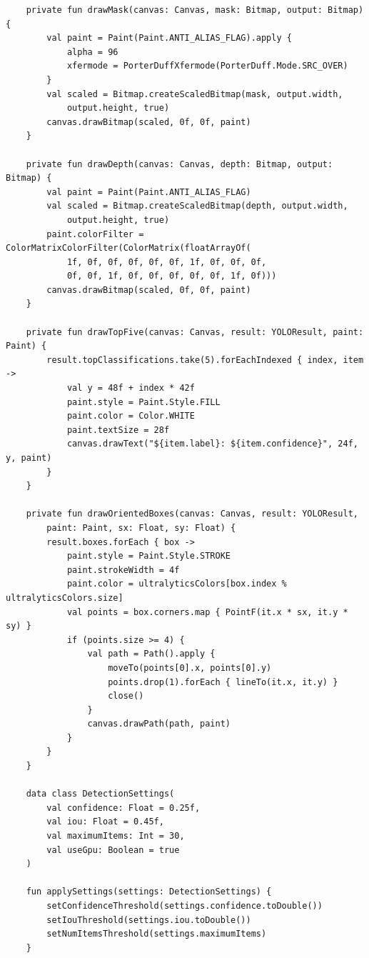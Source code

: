 \clearpage
\begingroup
\fontsize{6.5pt}{6.8pt}\selectfont
\begin{verbatim}
    private fun drawMask(canvas: Canvas, mask: Bitmap, output: Bitmap) {
        val paint = Paint(Paint.ANTI_ALIAS_FLAG).apply {
            alpha = 96
            xfermode = PorterDuffXfermode(PorterDuff.Mode.SRC_OVER)
        }
        val scaled = Bitmap.createScaledBitmap(mask, output.width,
            output.height, true)
        canvas.drawBitmap(scaled, 0f, 0f, paint)
    }

    private fun drawDepth(canvas: Canvas, depth: Bitmap, output: Bitmap) {
        val paint = Paint(Paint.ANTI_ALIAS_FLAG)
        val scaled = Bitmap.createScaledBitmap(depth, output.width,
            output.height, true)
        paint.colorFilter = ColorMatrixColorFilter(ColorMatrix(floatArrayOf(
            1f, 0f, 0f, 0f, 0f, 0f, 1f, 0f, 0f, 0f,
            0f, 0f, 1f, 0f, 0f, 0f, 0f, 0f, 1f, 0f)))
        canvas.drawBitmap(scaled, 0f, 0f, paint)
    }

    private fun drawTopFive(canvas: Canvas, result: YOLOResult, paint: Paint) {
        result.topClassifications.take(5).forEachIndexed { index, item ->
            val y = 48f + index * 42f
            paint.style = Paint.Style.FILL
            paint.color = Color.WHITE
            paint.textSize = 28f
            canvas.drawText("${item.label}: ${item.confidence}", 24f, y, paint)
        }
    }

    private fun drawOrientedBoxes(canvas: Canvas, result: YOLOResult,
        paint: Paint, sx: Float, sy: Float) {
        result.boxes.forEach { box ->
            paint.style = Paint.Style.STROKE
            paint.strokeWidth = 4f
            paint.color = ultralyticsColors[box.index % ultralyticsColors.size]
            val points = box.corners.map { PointF(it.x * sx, it.y * sy) }
            if (points.size >= 4) {
                val path = Path().apply {
                    moveTo(points[0].x, points[0].y)
                    points.drop(1).forEach { lineTo(it.x, it.y) }
                    close()
                }
                canvas.drawPath(path, paint)
            }
        }
    }

    data class DetectionSettings(
        val confidence: Float = 0.25f,
        val iou: Float = 0.45f,
        val maximumItems: Int = 30,
        val useGpu: Boolean = true
    )

    fun applySettings(settings: DetectionSettings) {
        setConfidenceThreshold(settings.confidence.toDouble())
        setIouThreshold(settings.iou.toDouble())
        setNumItemsThreshold(settings.maximumItems)
    }
\end{verbatim}
\endgroup

\label{appendix:a-end}
